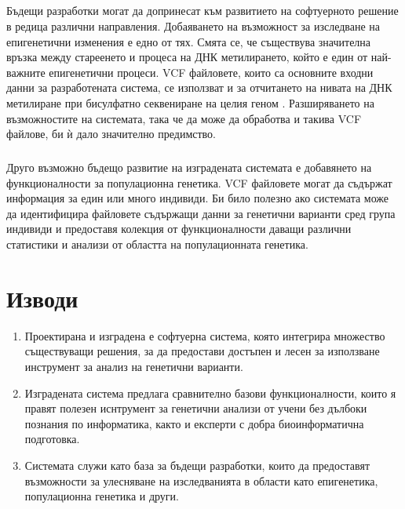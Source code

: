 \documentclass[pdftex,cyrillic,14pt,a4page,twoside,openright]{extreport}
\begin{document}
\paragraph{}
Бъдещи разработки могат да допринесат към развитието на софтуерното решение в редица различни направления. Добаяването на възможност за изследване на епигенетични изменения е едно от тях. Смята се, че съществува значителна връзка между стареенето и процеса на ДНК метилирането, който е един от най-важните епигенетични процеси. VCF файловете, които са основните входни данни за разработената система, се използват и за отчитането на нивата на ДНК метилиране при бисулфатно секвениране на целия геном \cite{barturen2013}\cite{merkel2018}. Разширяването на възможностите на системата, така че да може да обработва и такива VCF файлове, би ѝ дало значително предимство.

\paragraph{}
Друго възможно бъдещо развитие на изградената системата е добавянето на функционалности за популационна генетика. VCF файловете могат да съдържат информация за един или много индивиди. Би било полезно ако системата може да идентифицира файловете съдържащи данни за генетични варианти сред група индивиди и предоставя колекция от функционалности даващи различни статистики и анализи от областта на популационната генетика.

\chapter{Изводи}
\begin{enumerate}
	\item Проектирана и изградена е софтуерна система, която интегрира множество съществуващи решения, за да предостави достъпен и лесен за използване инструмент за анализ на генетични варианти.
	\item Изградената система предлага сравнително базови функционалности, които я правят полезен иснтрумент за генетични анализи от учени без дълбоки познания по информатика, както и експерти с добра биоинформатична подготовка.
	\item Системата служи като база за бъдещи разработки, които да предоставят възможности за улесняване на изследванията в области като епигенетика, популационна генетика и други.
\end{enumerate}


\cleardoublepage
{}
{}


\end{document}
